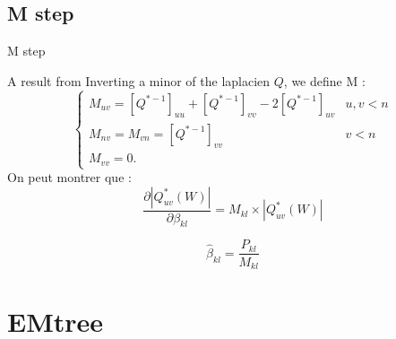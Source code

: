 \documentclass[11pt]{beamer}
\newcommand{\emphase}[1]{\textcolor{Complement}{#1}}
\newcommand{\argmax}{\mathop{\mathrm{argmax}}}
\begin{document}
\subsection{M step}
\begin{frame}{M step}
%
%  
% 
%
 \footnotesize 
 \begin{exampleblock}{A result from \cite{MixtTrees}}
Inverting a minor of the laplacien $Q$, we define M : 
\[\begin{cases}
    M_{uv} = [Q^{*-1}]_{uu} + [Q^{*-1}]_{vv} -2[Q^{*-1}]_{uv} & u,v < n\\
    M_{nv} =M_{vn} =[Q^{*-1}]_{vv} & v<n\\
     M_{vv} =0.
   \end{cases}\]
On peut montrer que :
\[ \frac{\partial|Q^*_{uv}(W)|}{\partial \beta_{kl}} = M_{kl} \times |Q^*_{uv}(W)|\]
\end{exampleblock}

\emphase{
   \large{\[\hat{\beta}_{kl}= \frac{P_{kl}}{M_{kl}}\]}
}
 \end{frame}
\section{EMtree}
\end{document}

